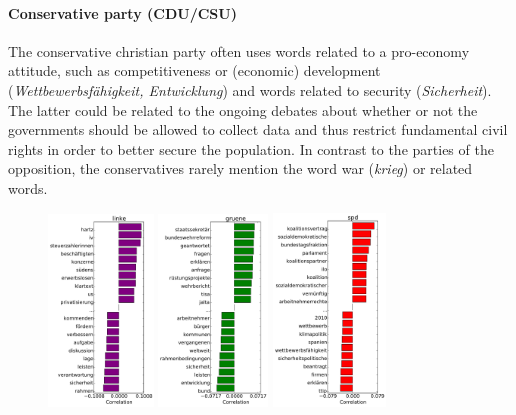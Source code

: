 \documentclass{article}
\begin{document}
\paragraph{\bf Conservative party (CDU/CSU)}
The conservative christian party often uses words related to a pro-economy attitude, such as competitiveness or (economic) development ({\em Wettbewerbsf\"ahigkeit, Entwicklung}) and words related to security ({\em Sicherheit}). The latter could be related to the ongoing debates about whether or not the governments should be allowed to collect data and thus restrict fundamental civil rights in order to better secure the population. In contrast to the parties of the opposition, the conservatives rarely mention the word war ({\em krieg}) or related words.


\begin{figure}
\begin{center}
\includegraphics[width=2.8cm]{images/party_word_correlations-linke-18.pdf} 
\includegraphics[width=2.9cm]{images/party_word_correlations-gruene-18.pdf} 
\includegraphics[width=3cm]{images/party_word_correlations-spd-18.pdf} 

\end{center}
\end{figure}
\end{document}
